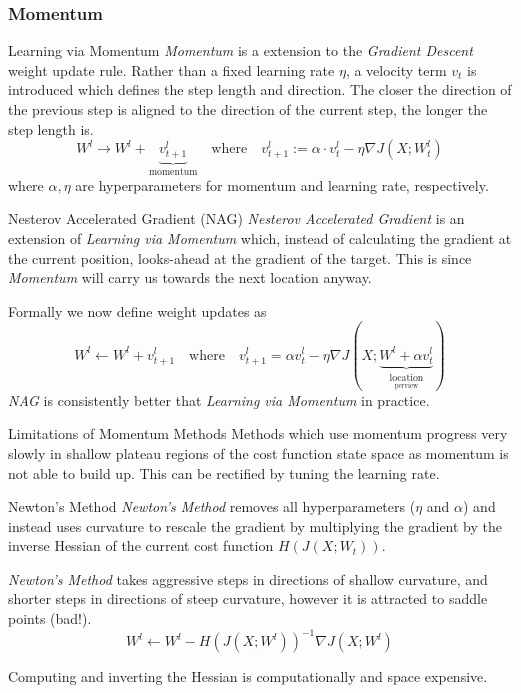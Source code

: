 \documentclass[11pt,a4paper]{article}
\begin{document}
\subsubsection{Momentum} \label{sec_Momentum}

  \begin{definition}{Learning via Momentum}
    \textit{Momentum} is a extension to the \textit{Gradient Descent} weight update rule. Rather than a fixed learning rate $\eta$, a velocity term $v_t$ is introduced which defines the step length and direction. The closer the direction of the previous step is aligned to the direction of the current step, the longer the step length is.
    \[ W^l\rightarrow W^l+\underbrace{v^l_{t+1}}_\text{momentum}\quad\text{where}\quad v^l_{t+1}:=\alpha\cdot v^l_t-\eta\nabla J(X;W_t^l) \]
    where $\alpha,\eta$ are hyperparameters for momentum and learning rate, respectively.
  \end{definition}

  \begin{proposition}{Nesterov Accelerated Gradient (NAG)}
    \textit{Nesterov Accelerated Gradient} is an extension of \textit{Learning via Momentum} which, instead of calculating the gradient at the current position, looks-ahead at the gradient of the target. This is since \textit{Momentum} will carry us towards the next location anyway.
    \par Formally we now define weight updates as
    \[ W^l\leftarrow W^l+v^l_{t+1}\quad\text{where}\quad v^l_{t+1}=\alpha v^l_t-\eta\nabla J(X;\underbrace{W^l+\alpha v^l_t}_{ \underset{\text{perview}}{\text{location}}}) \]
    \textit{NAG} is consistently better that \textit{Learning via Momentum} in practice.
  \end{proposition}

  \begin{remark}{Limitations of Momentum Methods}
    Methods which use momentum progress very slowly in shallow plateau regions of the cost function state space as momentum is not able to build up. This can be rectified by tuning the learning rate.
  \end{remark}

  \begin{proposition}{Newton's Method}
    \textit{Newton's Method} removes all hyperparameters ($\eta$ and $\alpha$) and instead uses curvature to rescale the gradient by multiplying the gradient by the inverse Hessian of the current cost function $H(J(X;W_t))$.
    \par \textit{Newton's Method} takes aggressive steps in directions of shallow curvature, and shorter steps in directions of steep curvature, however it is attracted to saddle points (bad!).
    \[ W^l\leftarrow W^l- H(J(X;W^l))^{-1}\nabla J(X;W^l) \]
    \par Computing and inverting the Hessian is computationally and space expensive.
  \end{proposition}
\end{document}
